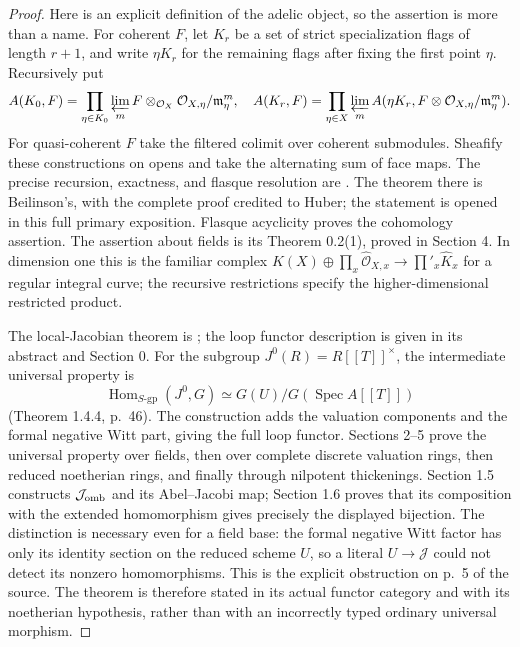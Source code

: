 \begin{proof}
Here is an explicit definition of the adelic object, so the assertion
is more than a name. For coherent $F$, let $K_r$ be a set of strict
specialization flags of length $r+1$, and write $\eta K_r$ for the
remaining flags after fixing the first point $\eta$. Recursively put
\[
 A(K_0,F)=\prod_{\eta\in K_0}\varprojlim_m
       F\otimes_{\mathcal O_X}\mathcal O_{X,\eta}/\mathfrak m_\eta^m,
 \quad
 A(K_r,F)=\prod_{\eta\in X}\varprojlim_m
       A(\eta K_r,F\otimes\mathcal O_{X,\eta}/\mathfrak m_\eta^m).
\]
For quasi-coherent $F$ take the filtered colimit over coherent
submodules. Sheafify these constructions on opens and take the
alternating sum of face maps. The precise recursion, exactness, and
flasque resolution are \cite[Section 2.1, formulas (2.1)--(2.3),
Theorem 2.1]{BBraunlingEtAl}. The theorem there is Beilinson's,
with the complete proof credited to Huber; the statement is opened
in this full primary exposition. Flasque acyclicity proves the
cohomology assertion. The assertion about fields is its Theorem 0.2(1),
proved in Section 4. In dimension one this is the familiar complex
$K(X)\oplus\prod_x\widehat{\mathcal O}_{X,x}\to
\prod'_x\widehat K_x$ for a regular integral curve; the recursive
restrictions specify the higher-dimensional restricted product.

The local-Jacobian theorem is
\cite[Theorem 1.6.6, p.~54]{BContou2013}; the loop functor description
is given in its abstract and Section 0. For the subgroup
$J^0(R)=R[[T]]^\times$, the intermediate universal property is
\[
 \operatorname{Hom}_{S\text{-}\mathrm{gp}}(J^0,G)
 \simeq G(U)/G(\operatorname{Spec}A[[T]])
\]
(Theorem 1.4.4, p.~46). The construction adds the valuation components
and the formal negative Witt part, giving the full loop functor.
Sections 2--5 prove the universal property over fields, then over
complete discrete valuation rings, then reduced noetherian rings,
and finally through nilpotent thickenings. Section 1.5 constructs
$\mathcal J_{\rm omb}$ and its Abel--Jacobi map; Section 1.6 proves
that its composition with the extended homomorphism gives precisely
the displayed bijection. The distinction is necessary even for a
field base: the formal negative Witt factor has only its identity
section on the reduced scheme $U$, so a literal $U\to\mathcal J$
could not detect its nonzero homomorphisms. This is the explicit
obstruction on p.~5 of the source. The theorem is therefore stated
in its actual functor category and with its noetherian hypothesis,
rather than with an incorrectly typed ordinary universal morphism.
\end{proof}

